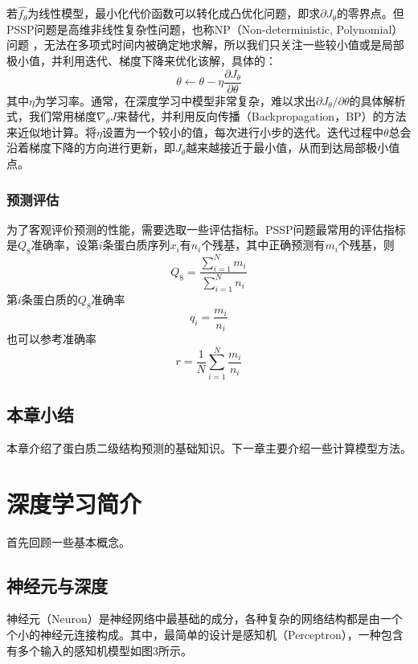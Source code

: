 \documentclass[a4paper, tikz]{article}
\begin{document}
若$\hat{f_{\theta}}$为线性模型，最小化代价函数可以转化成凸优化问题，即求$\partial J_{\theta}$的零界点。但PSSP问题是高维非线性复杂性问题，也称NP（Non-deterministic, Polynomial）问题\citep{lathrop1994protein} ，无法在多项式时间内被确定地求解，所以我们只关注一些较小值或是局部极小值，并利用迭代、梯度下降来优化该解，具体的：
\begin{equation}
	\theta \gets \theta - \eta \frac{\partial J_{\theta}}{\partial \theta}
\end{equation}
其中$\eta$为学习率。通常，在深度学习中模型非常复杂，难以求出${\partial J_{\theta}}/{\partial \theta}$的具体解析式，我们常用梯度$\nabla_{\theta} J$来替代，并利用反向传播（Backpropagation，BP）的方法来近似地计算。将$\eta$设置为一个较小的值，每次进行小步的迭代。迭代过程中$\theta$总会沿着梯度下降的方向进行更新，即$J_{\theta}$越来越接近于最小值，从而到达局部极小值点。

\subsubsection{预测评估}
为了客观评价预测的性能，需要选取一些评估指标。PSSP问题最常用的评估指标是$Q_8$准确率，设第$i$条蛋白质序列$x_i$有$n_i$个残基，其中正确预测有$m_i$个残基，则
\begin{equation}
	Q_8=\frac{\sum\limits^{N}_{i=1}m_i}{\sum\limits^{N}_{i=1}n_i}
\end{equation}
第$i$条蛋白质的$Q_8$准确率
\begin{equation}
	q_i = \frac{m_i}{n_i}
\end{equation}
也可以参考准确率
\begin{equation}
	r=\frac{1}{N}\sum\limits^{N}_{i=1}\frac{m_i}{n_i}
\end{equation}

\subsection{本章小结}
本章介绍了蛋白质二级结构预测的基础知识。下一章主要介绍一些计算模型方法。

\newpage


\section{深度学习简介}%
首先回顾一些基本概念。

\subsection{神经元与深度}
神经元（Neuron）是神经网络中最基础的成分，各种复杂的网络结构都是由一个个小的神经元连接构成。其中，最简单的设计是感知机（Perceptron），一种包含有多个输入的感知机模型如图3所示。
\end{document}
